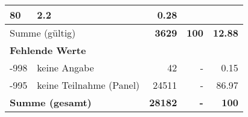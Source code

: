 \begin{longtable}{lXrrr}
       \num{80} &
       \num[round-mode=places,round-precision=2]{2.2} &
         \num[round-mode=places,round-precision=2]{0.28} \\
     \midrule
     \multicolumn{2}{l}{Summe (gültig)} &
       \textbf{\num{3629}} &
     \textbf{\num{100}} &
       \textbf{\num[round-mode=places,round-precision=2]{12.88}} \\
     \multicolumn{5}{l}{\textbf{Fehlende Werte}}\\
       -998 &
       keine Angabe &
         \num{42} &
        - &
         \num[round-mode=places,round-precision=2]{0.15} \\
       -995 &
       keine Teilnahme (Panel) &
         \num{24511} &
        - &
         \num[round-mode=places,round-precision=2]{86.97} \\
     \midrule
     \multicolumn{2}{l}{\textbf{Summe (gesamt)}} &
          \textbf{\num{28182}} &
        \textbf{-} &
        \textbf{\num{100}} \\
     \bottomrule
     \end{longtable}
     
